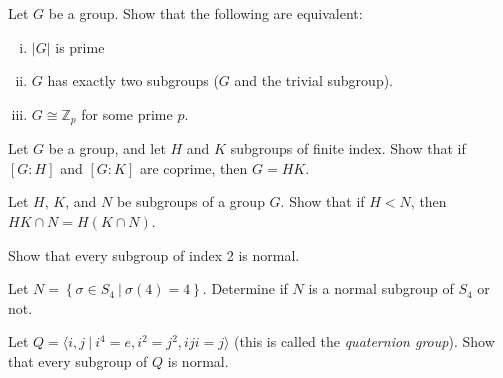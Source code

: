 \documentclass{problemset}
\begin{document}
\begin{exercise} Let \(G\) be a group. Show that the following are equivalent:
\begin{enumerate}[(i)]
\item \(|G|\) is prime
\item \(G\) has exactly two subgroups (\(G\) and the trivial subgroup).
\item \(G \cong \mathbb{Z}_p\) for some prime \(p\).
\end{enumerate}
\end{exercise}



\begin{exercise}Let \(G\) be a group, and let \(H\) and \(K\) subgroups of finite index. Show that if \([G:H]\) and \([G:K]\) are coprime, then \(G=HK\).
\end{exercise}



\begin{exercise} 
Let \(H\), \(K\), and \(N\) be subgroups of a group \(G\). Show that if \(H < N\), then \(HK \cap N = H(K \cap N)\).
\end{exercise}



\begin{exercise} 
Show that every subgroup of index 2 is normal.
\end{exercise}



\begin{exercise} 
Let \(N = \left\{ \sigma \in S_4\ |\ \sigma(4)=4\right\}\).  Determine if \(N\) is a normal subgroup of \(S_4\) or not.
\end{exercise}


\begin{exercise} 
Let \(Q = \langle i,j \ |\ i^4=e, i^2=j^2, iji=j \rangle\) (this is called the {\em quaternion group}).  Show that every subgroup of \(Q\) is normal.
\end{exercise}
\end{document}
